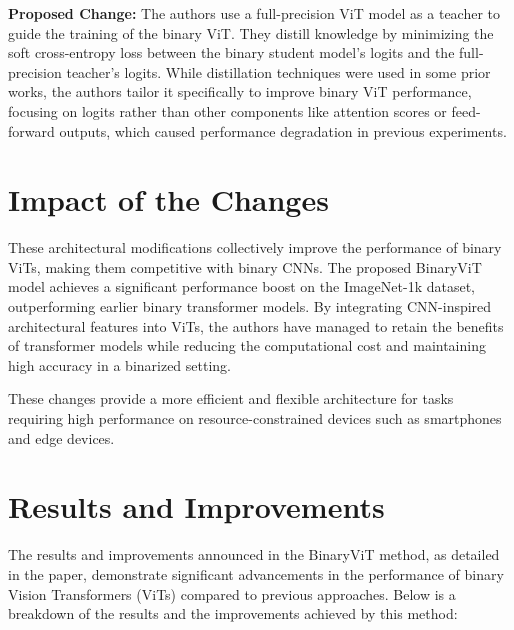 \documentclass{report}
\begin{document}
	\textbf{Proposed Change:} The authors use a full-precision ViT model as a teacher to guide the training of the binary ViT. They distill knowledge by minimizing the soft cross-entropy loss between the binary student model’s logits and the full-precision teacher’s logits. While distillation techniques were used in some prior works, the authors tailor it specifically to improve binary ViT performance, focusing on logits rather than other components like attention scores or feed-forward outputs, which caused performance degradation in previous experiments.
	
	
	\section{Impact of the Changes}
	These architectural modifications collectively improve the performance of binary ViTs, making them competitive with binary CNNs. The proposed BinaryViT model achieves a significant performance boost on the ImageNet-1k dataset, outperforming earlier binary transformer models. By integrating CNN-inspired architectural features into ViTs, the authors have managed to retain the benefits of transformer models while reducing the computational cost and maintaining high accuracy in a binarized setting.
	
	These changes provide a more efficient and flexible architecture for tasks requiring high performance on resource-constrained devices such as smartphones and edge devices.
	
	
	
	\section{Results and Improvements}
	The results and improvements announced in the BinaryViT method, as detailed in the paper, demonstrate significant advancements in the performance of binary Vision Transformers (ViTs) compared to previous approaches. Below is a breakdown of the results and the improvements achieved by this method:
	
\end{document}
